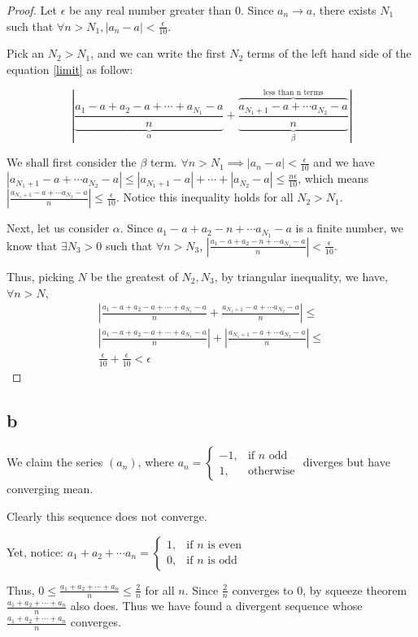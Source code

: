 \documentclass{article}
\theoremstyle{definition}
\theoremstyle{definition}
\theoremstyle{remark}
\begin{document}
\begin{proof}
    Let $\epsilon$ be any real number greater than 0. Since $a_n \rightarrow a$, there exists $N_1$ such that $\forall n>N_1, |a_n - a| < \frac{\epsilon}{10}$. 

    Pick an $N_2>N_1$, and we can write the first $N_2$ terms of the left hand side of the equation \ref{limit} as follow:

    \begin{equation}
      |
      \underbrace{
      \frac{a_1-a+a_2-a+\cdots+a_{N_1}-a}{n}
      }_{\alpha} + 
      \underbrace{
        \overbrace{
          \frac{a_{N_1+1}-a + \cdots a_{N_2}-a}{n}
      }^{\text{less than n terms}}
      }_{\beta}
      |
    \end{equation}

    We shall first consider the $\beta$ term. 
    $\forall n>N_1 \implies |a_n-a|<\frac{\epsilon}{10} $ and we have $ | a_{N_1+1}-a + \cdots a_{N_2}-a| \leq 
    |a_{N_1+1}-a| + \cdots + |a_{N_2}-a| \leq \frac{n\epsilon}{10}$, which means 
          $|\frac{a_{N_1+1}-a + \cdots a_{N_2}-a}{n}|\leq \frac{\epsilon}{10}$. Notice this inequality holds for all $N_2>N_1$.

          Next, let us consider $\alpha$. Since $a_1-a+a_2-n + \cdots a_{N_1}-a$ is a finite number, we know that $\exists N_3>0$ such that $\forall n>N_3$, $|\frac{a_1-a+a_2-n + \cdots a_{N_1}-a}{n}|<\frac{\epsilon}{10}$.

    Thus, picking $N$ be the greatest of $N_2, N_3$, by triangular inequality, we have, $\forall n>N$, 
    \begin{multline}
      |
      \frac{a_1-a+a_2-a+\cdots+a_{N_1}-a}{n}+\frac{a_{N_1+1}-a + \cdots a_{N_2}-a}{n}
      | \leq \\
      |\frac{a_1-a+a_2-a+\cdots+a_{N_1}-a}{n}|+|\frac{a_{N_1+1}-a + \cdots a_{N_2}-a}{n}| \leq \\
      \frac{\epsilon}{10} + \frac{\epsilon}{10} < \epsilon
    \end{multline}

    
\end{proof}
\subsection*{b}
We claim the series $(a_n)$, where 
$
a_n = \begin{cases}
			-1, & \text{if $n$ odd}\\
            1, & \text{otherwise}
		 \end{cases}
$
diverges but have converging mean.

Clearly this sequence does not converge. 

Yet, notice: $a_1+a_2+\cdots a_n = 
\begin{cases}
1, & \text{if $n$ is even}\\
0, & \text{if $n$ is odd}
\end{cases}$

Thus, $0\leq\frac{a_1+a_2+\cdots + a_n}{n}\leq\frac{2}{n} $ for all $n$. Since $\frac{2}{n}$ converges to $0$, by squeeze theorem $\frac{a_1+a_2+\cdots + a_n}{n}$ also does. Thus we have found a divergent sequence whose $\frac{a_1+a_2+\cdots + a_n}{n}$ converges.
\end{document}
